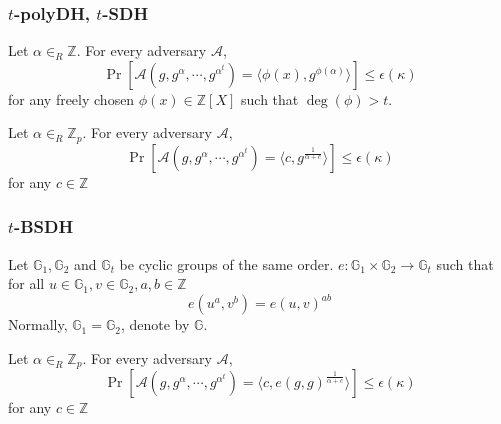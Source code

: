 \documentclass[UFT8]{beamer}
\begin{document}
\begin{frame}
	\frametitle{$t$-polyDH, $t$-SDH}
	\begin{definition}[$t$-polyDH]
		Let $\alpha \in_R \mathbb{Z}$. For every adversary $\mathcal{A}$,
		\begin{equation*}
			\Pr\left[\mathcal{A}\left(g, g^\alpha, \cdots, g^{\alpha^t}\right) = \langle \phi(x), g^{\phi(\alpha)} \rangle\right] \le \epsilon(\kappa)
		\end{equation*}
		for any freely chosen $\phi(x) \in \mathbb{Z}[X]$ such that $\deg(\phi) > t$.
	\end{definition}

	\begin{definition}
		Let $\alpha \in_R \mathbb{Z}_p$. For every adversary $\mathcal{A}$,
		\begin{equation*}
			\Pr\left[\mathcal{A}\left(g, g^\alpha, \cdots, g^{\alpha^t} \right) = \langle c, g^{\frac{1}{\alpha + c}} \rangle \right] \le \epsilon(\kappa)
		\end{equation*}
		for any $c \in \mathbb{Z}$
	\end{definition}

\end{frame}

\begin{frame}
    \frametitle{$t$-BSDH}
	\begin{definition}
		Let $\mathbb{G}_1, \mathbb{G}_2$ and $\mathbb{G}_t$ be cyclic groups of the same order.
		$e: \mathbb{G}_1 \times \mathbb{G}_2 \rightarrow \mathbb{G}_t$ such that for all $u \in \mathbb{G}_1, v \in \mathbb{G}_2, a, b \in \mathbb{Z}$
		$$
		e(u^a, v^b) = e(u, v)^{ab}
		$$
		Normally, $\mathbb{G}_1 = \mathbb{G}_2$, denote by $\mathbb{G}$.
	\end{definition}

	\begin{definition}[$t$-BSDH]
		Let $\alpha \in_R \mathbb{Z}_p$. For every adversary $\mathcal{A}$,
		\begin{equation*}
			\Pr\left[\mathcal{A}\left(g, g^\alpha, \cdots, g^{\alpha^t} \right) = \langle c, e(g, g)^{\frac{1}{\alpha + c}} \rangle \right] \le \epsilon(\kappa)
		\end{equation*}
		for any $c \in \mathbb{Z}$
	\end{definition}
\end{frame}
\end{document}
